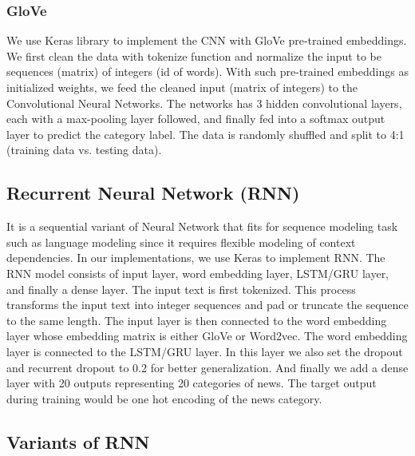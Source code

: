 \documentclass{article}
\begin{document}
\subsubsection{GloVe}
 We use Keras library to implement the CNN with GloVe pre-trained embeddings.
 We first clean the data with tokenize function and normalize the input to be sequences (matrix) of integers (id of words). With such pre-trained embeddings as initialized weights, we feed the cleaned input (matrix of integers) to the Convolutional Neural Networks. The networks has 3 hidden convolutional layers, each with a max-pooling layer followed, and finally fed into a softmax output layer to predict the category label. The data is randomly shuffled and split to 4:1 (training data vs. testing data).

\subsection{Recurrent Neural Network (RNN)}
It is a sequential variant of Neural Network that fits for sequence modeling task such as language modeling since it requires flexible modeling of context dependencies. In our implementations, we use Keras to implement RNN. The RNN model consists of input layer, word embedding layer, LSTM/GRU layer, and finally a dense layer. The input text is first tokenized. This process transforms the input text into integer sequences and pad or truncate the sequence to the same length. The input layer is then connected to the word embedding layer whose embedding matrix is either GloVe or Word2vec. The word embedding layer is connected to the LSTM/GRU layer. In this layer we also set the dropout and recurrent dropout to 0.2 for better generalization. And finally we add a dense layer with 20 outputs representing 20 categories of news. The target output during training would be one hot encoding of the news category.


\subsection{Variants of RNN}
\end{document}
